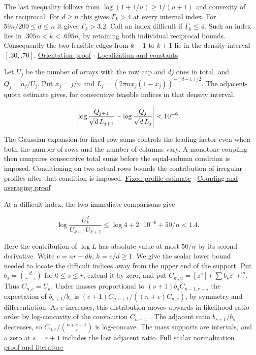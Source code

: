 \documentclass[11pt]{article}
\begin{document}
The last inequality follows from $\log(1+1/u)\ge1/(u+1)$ and convexity of the reciprocal. For $d\ge n$ this gives $\Gamma_k>4$ at every internal index. For $59n/200\le d\le n$ it gives $\Gamma_k>3.2$. Call an index difficult if $\Gamma_k\le4$. Such an index lies in $.305n<k<.695n$, by retaining both individual reciprocal bounds. Consequently the two feasible edges from $k-1$ to $k+1$ lie in the density interval $[.30,.70]$. \href{https://github.com/ProgramComputer/open-math-research/blob/main/topics/balanced-arrays/orientation-normalization.md}{Orientation proof}  $\cdot$  \href{https://github.com/ProgramComputer/open-math-research/blob/main/topics/balanced-arrays/adjacent-quotas/scalar.md}{Localization and constants}

Let $U_j$ be the number of arrays with the row cap and $dj$ ones in total, and $Q_j=a_j/U_j$. Put $x_j=j/n$ and $L_j=(2\pi n x_j(1-x_j))^{-(d-1)/2}$. The adjacent-quota estimate gives, for consecutive feasible indices in that density interval,

\[
\left|\log\frac{Q_{j+1}}{\sqrt d\thinspace{}L_{j+1}}-\log\frac{Q_j}{\sqrt d\thinspace{}L_j}\right|<10^{-6}.
\]

The Gaussian expansion for fixed row sums controls the leading factor even when both the number of rows and the number of columns vary. A monotone coupling then compares consecutive total sums before the equal-column condition is imposed. Conditioning on two actual rows bounds the contribution of irregular profiles after that condition is imposed. \href{https://github.com/ProgramComputer/open-math-research/blob/main/topics/balanced-arrays/adjacent-quotas/fixed-profile.md}{Fixed-profile estimate}  $\cdot$  \href{https://github.com/ProgramComputer/open-math-research/blob/main/topics/balanced-arrays/adjacent-quotas/comparison.md}{Coupling and averaging proof}

At a difficult index, the two immediate comparisons give

\[
\log\frac{U_k^2}{U_{k-1}U_{k+1}}\le\log4+2\cdot10^{-6}+50/n<1.4 .
\]

Here the contribution of $\log L$ has absolute value at most $50/n$ by its second derivative. Write $e=nr-dk$, $h=e/d\ge1$. We give the scalar lower bound needed to locate the difficult indices away from the upper end of the support. Put $b_s=\binom d{r-s}$ for $0\le s\le r$, extend it by zero, and put $C_{m,u}=[z^u](\sum b_s z^s)^m$. Thus $C_{n,e}=U_k$. Under masses proportional to $(s+1)b_s C_{n-1,e-s}$ the expectation of $b_{s+1}/b_s$ is $(e+1)C_{n,e+1}/((n+e)C_{n,e})$, by symmetry and differentiation. As $e$ increases, this distribution moves upwards in likelihood-ratio order by log-concavity of the convolution $C_{n-1,\cdot}$. The adjacent ratio $b_{s+1}/b_s$ decreases, so $C_{n,e}/\binom{n+e-1}e$ is log-concave. The mass supports are intervals, and a zero at $s=r+1$ includes the last adjacent ratio. \href{https://github.com/ProgramComputer/open-math-research/blob/8a0a986e6baeed69b30de189e75c02fd2c8cb955/topics/balanced-arrays/deficit-curvature/scalar.md}{Full scalar normalization proof and literature}
\end{document}
